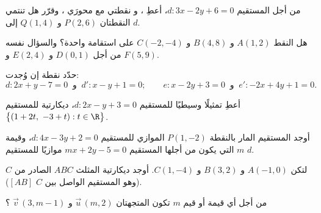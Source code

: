 \begin{exercise}[$\star$]\label{exo:g11:vect:4}
من أجل المستقيم $d: 3x - 2y + 6 = 0$، أعطِ ، و
نقطتي  مع محورَي ، وقرّر هل تنتمي النقطتان
$P(2, 6)$ و $Q(1, 4)$ إلى $d$.
\end{exercise}

\begin{exercise}[$\star\star$]\label{exo:g11:vect:5}
هل النقط $A(1, 2)$ و $B(4, 8)$ و $C(-2, -4)$ على استقامة واحدة؟ والسؤال نفسه
من أجل $D(0, 1)$ و $E(2, 4)$ و $F(5, 9)$.
\end{exercise}

\begin{exercise}[$\star\star$]\label{exo:g11:vect:6}
حدّد نقطة  إن وُجدت:
\[
d: 2x + y - 7 = 0 \ \text{ و }\ d': x - y + 1 = 0;
\qquad
e: x - 2y + 3 = 0 \ \text{ و }\ e': -2x + 4y + 1 = 0 .
\]
\end{exercise}

\begin{exercise}[$\star\star$]\label{exo:g11:vect:7}
أعطِ تمثيلًا وسيطيًا للمستقيم $d: 2x - y + 3 = 0$، 
ديكارتية للمستقيم
$\bigl\{(1 + 2t,\ -3 + t) : t \in \R\bigr\}$.
\end{exercise}

\begin{exercise}[$\star\star$]\label{exo:g11:vect:8}
أوجد  المستقيم المار بالنقطة $P(1, -2)$ الموازي للمستقيم
$d: 4x - 3y + 2 = 0$، وقيمة $m$ التي يكون من أجلها المستقيم
$mx + 2y - 5 = 0$ موازيًا للمستقيم $d$.
\end{exercise}

\begin{exercise}[$\star\star$]\label{exo:g11:vect:9}
لتكن $A(-1, 0)$ و $B(3, 2)$ و $C(1, -4)$. أوجد  ديكارتية
\emph{} المثلث $ABC$ الصادر من $C$ (وهو المستقيم الواصل بين $C$
 $[AB]$).
\end{exercise}

\begin{exercise}[$\star\star$]\label{exo:g11:vect:10}
من أجل أي قيمة أو قيم  $m$ تكون المتجهتان
$\vec u\,(m, 2)$ و $\vec v\,(3, m - 1)$ ؟
\end{exercise}


